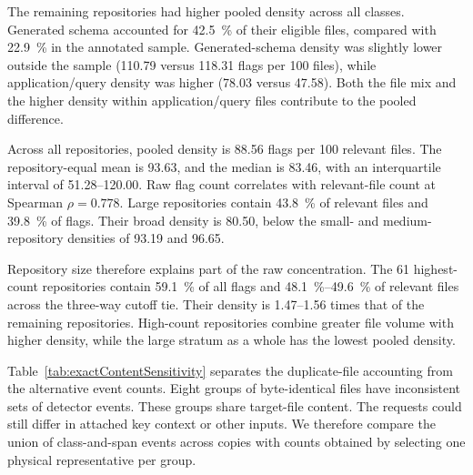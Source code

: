 The remaining repositories had higher pooled density across all classes. Generated schema accounted for \qty{42.5}{\percent} of their eligible files, compared with \qty{22.9}{\percent} in the annotated sample. Generated-schema density was slightly lower outside the sample (\num{110.79} versus \num{118.31} flags per 100 files), while application/query density was higher (\num{78.03} versus \num{47.58}). Both the file mix and the higher density within application/query files contribute to the pooled difference.

Across all repositories, pooled density is \num{88.56} flags per 100 relevant files. The repository-equal mean is \num{93.63}, and the median is \num{83.46}, with an interquartile interval of \numrange{51.28}{120.00}. Raw flag count correlates with relevant-file count at Spearman $\rho=\num{0.778}$. Large repositories contain \qty{43.8}{\percent} of relevant files and \qty{39.8}{\percent} of flags. Their broad density is \num{80.50}, below the small- and medium-repository densities of \num{93.19} and \num{96.65}.

Repository size therefore explains part of the raw concentration. The 61 highest-count repositories contain \qty{59.1}{\percent} of all flags and \qtyrange{48.1}{49.6}{\percent} of relevant files across the three-way cutoff tie. Their density is \numrange{1.47}{1.56} times that of the remaining repositories. High-count repositories combine greater file volume with higher density, while the large stratum as a whole has the lowest pooled density.

Table~\ref{tab:exactContentSensitivity} separates the duplicate-file accounting from the alternative event counts. Eight groups of byte-identical files have inconsistent sets of detector events. These groups share target-file content. The requests could still differ in attached key context or other inputs. We therefore compare the union of class-and-span events across copies with counts obtained by selecting one physical representative per group.

